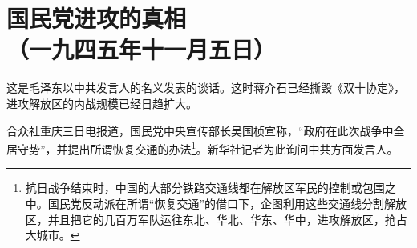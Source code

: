 \documentclass[cn,11pt,chinese]{elegantbook}
\def\myformat#1{\hfil\hfil #1}
\begin{document}
\newpage\section*{\myformat{国民党进攻的真相}\\\myformat{（一九四五年十一月五日）}}
\begin{introduction}\item  这是毛泽东以中共发言人的名义发表的谈话。这时蒋介石已经撕毁《双十协定》，进攻解放区的内战规模已经日趋扩大。\end{introduction}
合众社重庆三日电报道，国民党中央宣传部长吴国桢宣称，“政府在此次战争中全居守势”，并提出所谓恢复交通的办法\footnote[1]{ 抗日战争结束时，中国的大部分铁路交通线都在解放区军民的控制或包围之中。国民党反动派在所谓“恢复交通”的借口下，企图利用这些交通线分割解放区，并且把它的几百万军队运往东北、华北、华东、华中，进攻解放区，抢占大城市。}。新华社记者为此询问中共方面发言人。\\
\end{document}
